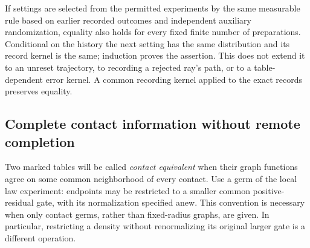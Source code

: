 \begin{remark}
If settings are selected from the permitted experiments by the same
measurable rule based on earlier recorded outcomes and independent
auxiliary randomization, equality also holds for every fixed finite
number of preparations.  Conditional on the history the next setting
has the same distribution and its record kernel is the same; induction
proves the assertion.  This does not extend it to an unreset trajectory,
to recording a rejected ray's path, or to a table-dependent error kernel.
A common recording kernel applied to the exact records preserves equality.
\end{remark}

\subsection{Complete contact information without remote completion}

Two marked tables will be called \emph{contact equivalent} when their
graph functions agree on some common neighborhood of every contact.
Use a germ of the local law experiment: endpoints may be restricted to a
smaller common positive-residual gate, with its normalization specified
anew.  This convention is necessary when only contact germs, rather than
fixed-radius graphs, are given.  In particular, restricting a density
without renormalizing its original larger gate is a different operation.

